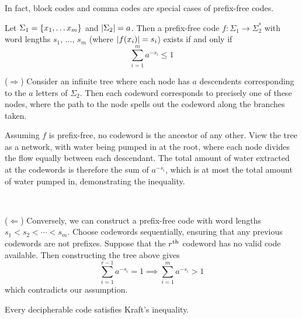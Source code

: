 \documentclass{article}
\begin{document}
\begin{note}
	In fact, block codes and comma codes are special cases of prefix-free codes.
\end{note}

\begin{theorem}
	\label{krafts-inequality}
    Let $\Sigma_1 = \left\lbrace x_1, \dots x_m \right\rbrace$
    and $\left\lvert \Sigma_2 \right\rvert = a$.
    Then a prefix-free code $f: \Sigma_1 \to \Sigma_2^*$
    with word lengths $s_1, \, \dots, \, s_m$
    (where $\left\lvert f(x_i) \right\rvert = s_i$)
    exists if and only if
    \[
	\sum_{i=1}^m a^{-s_i} \leq 1
	\]
\end{theorem}

\begin{prf}
    ($\Rightarrow$)
    Consider an infinite tree
    where each node has $a$ descendents
    corresponding to the $a$ letters of $\Sigma_2$.
    Then each codeword corresponds to precisely one of these nodes,
    where the path to the node spells out the codeword along the branches taken.
    
    Assuming $f$ is prefix-free,
    no codeword is the ancestor of any other.
    View the tree as a network, with water being pumped in at the root,
    where each node divides the flow equally between each descendant.
    The total amount of water extracted at the codewords is therefore
    the sum of $a^{-s_i}$,
    which is at most the total amount of water pumped in,
    demonstrating the inequality. 
    
    \ 
    
    ($\Leftarrow$)
    Conversely, we can construct a prefix-free code
    with word lengths $s_1 < s_2 < \cdots < s_m$.
    Choose codewords sequentially,
    ensuring that any previous codewords are not prefixes.
    Suppose that the $r^{\text{th}}$ codeword has no valid code available.
    Then constructing the tree above gives
    \[
	\sum_{i=1}^{r-1} a^{-s_i} = 1
	\implies
	\sum_{i=1}^{m} a^{-s_i} > 1
	\]
	which contradicts our assumption.
\end{prf}

\begin{theorem}
	\label{mcmillan-karush}
    Every decipherable code satisfies Kraft's inequality.
\end{theorem}
\end{document}
